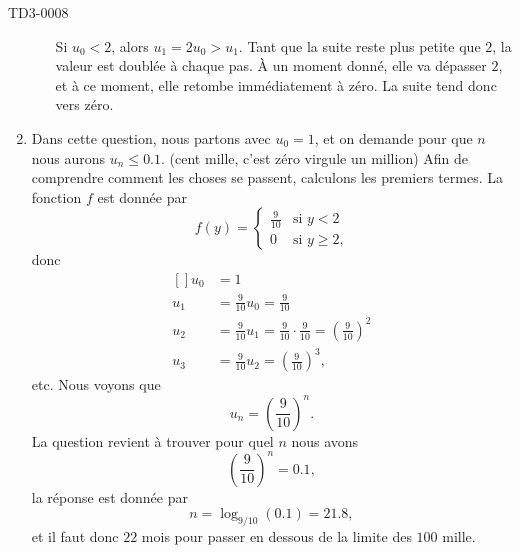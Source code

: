 \begin{corrige}{TD3-0008}
\begin{enumerate}
\begin{enumerate}
					Si $u_0<2$, alors $u_1=2u_0>u_1$. Tant que la suite reste plus petite que $2$, la valeur est doublée à chaque pas. À un moment donné, elle va dépasser $2$, et à ce moment, elle retombe immédiatement à zéro. La suite tend donc vers zéro.
					
			\end{enumerate}
			
		\item
			Dans cette question, nous partons avec $u_0=1$, et on demande pour que $n$ nous aurons $u_n\leq 0.1$. (cent mille, c'est zéro virgule un million) Afin de comprendre comment les choses se passent, calculons les premiers termes. La fonction $f$ est donnée par
			\begin{equation}		\label{EqLaFnfcandaad}
				f(y)=\begin{cases}
					\frac{ 9 }{ 10 }	&	\text{si $y<2$}\\
					0	&	 \text{si $y\geq 2$,}
				\end{cases}
			\end{equation}
			donc
			\begin{equation}
				\begin{aligned}[]
					u_0&=1\\
					u_1&=\frac{ 9 }{ 10 }u_0=\frac{ 9 }{ 10 }\\
					u_2&=\frac{ 9 }{ 10 }u_1=\frac{ 9 }{ 10 }\cdot\frac{ 9 }{ 10 }=\left( \frac{ 9 }{ 10 } \right)^2\\
					u_3&=\frac{ 9 }{ 10 }u_2=\left( \frac{ 9 }{ 10 } \right)^3,
				\end{aligned}
			\end{equation}
			etc. Nous voyons que
			\begin{equation}
				u_n=\left( \frac{ 9 }{ 10 } \right)^n.
			\end{equation}
			La question revient à trouver pour quel $n$ nous avons
			\begin{equation}
				\left( \frac{ 9 }{ 10 } \right)^n=0.1,
			\end{equation}
			la réponse est donnée par
			\begin{equation}
				n=\log_{9/10}(0.1)=21.8,
			\end{equation}
			et il faut donc $22$ mois pour passer en dessous de la limite des $100$ mille.


\end{enumerate}
\end{corrige}
